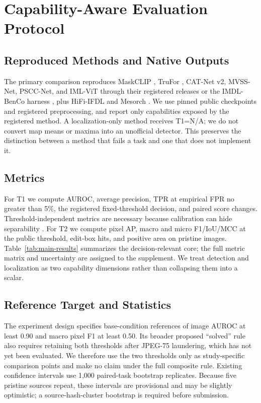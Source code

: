 \section{Capability-Aware Evaluation Protocol}
\label{sec:protocol}

\subsection{Reproduced Methods and Native Outputs}

The primary comparison reproduces MaskCLIP \citep{wang2025opensdi}, TruFor \citep{guillaro2022trufor}, CAT-Net v2, MVSS-Net, PSCC-Net, and IML-ViT through their registered releases or the IMDL-BenCo harness \citep{ma2024imdldbenco}, plus HiFi-IFDL \citep{guo2023hifi} and Mesorch \citep{zhu2024mesorch}. We use pinned public checkpoints and registered preprocessing, and report only capabilities exposed by the registered method. A localization-only method receives T1=N/A; we do not convert map means or maxima into an unofficial detector. This preserves the distinction between a method that fails a task and one that does not implement it.

\subsection{Metrics}

For T1 we compute AUROC, average precision, TPR at empirical FPR no greater than 5\%, the registered fixed-threshold decision, and paired score changes. Threshold-independent metrics are necessary because calibration can hide separability \citep{yang2026calibration}. For T2 we compute pixel AP, macro and micro F1/IoU/MCC at the public threshold, edit-box hits, and positive area on pristine images. Table~\ref{tab:main-results} summarizes the decision-relevant core; the full metric matrix and uncertainty are assigned to the supplement. We treat detection and localization as two capability dimensions rather than collapsing them into a scalar.

\subsection{Reference Target and Statistics}

The experiment design specifies base-condition references of image AUROC at least 0.90 and macro pixel F1 at least 0.50. Its broader proposed ``solved'' rule also requires retaining both thresholds after JPEG-75 laundering, which has not yet been evaluated. We therefore use the two thresholds only as study-specific comparison points and make no claim under the full composite rule. Existing confidence intervals use 1,000 paired-task bootstrap replicates. Because five pristine sources repeat, these intervals are provisional and may be slightly optimistic; a source-hash-cluster bootstrap is required before submission.


